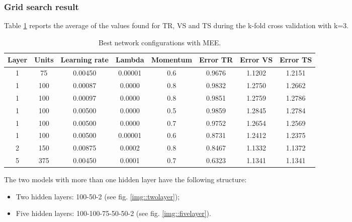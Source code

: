 \subsubsection{Grid search result}
Table \ref{tab:best_nets} reports the average of the values found for TR, VS and TS during the k-fold cross validation with k=3.   
\begin{center}
\small\addtolength{\tabcolsep}{-3pt}
\begin{table}[h!]
	\centering
	\begin{tabular}{|c|c|c|c|c|c|c|c|}
		\hline
		\textbf{Layer}& \textbf{Units}& \textbf{Learning rate} & \multicolumn{1}{l|}{\textbf{Lambda}} & \textbf{Momentum} & \textbf{Error TR}& \textbf{Error VS}& \textbf{Error TS}\\ \hline
			1 & 75 & 0.00450 & 0.00001 & 0.6  & 0.9676 & 1.1202 & 1.2151  \\
			1 & 100 & 0.00087 & 0.0000 & 0.8  & 0.9832 & 1.2750 &  1.2662\\
			1 & 100 & 0.00097 & 0.0000 & 0.8  & 0.9851 & 1.2759 &  1.2786\\
			1 & 100 & 0.00500 & 0.0000 & 0.5  & 0.9859 & 1.2845 & 1.2784 \\
			1 & 100 & 0.00500 & 0.0000 & 0.7  & 0.9752 & 1.2654 & 1.2569 \\
			1 & 100 & 0.00500 & 0.00001 & 0.6  & 0.8731& 1.2412 & 1.2375 \\
			2 & 150 & 0.00875 & 0.0002 & 0.8  & 0.8467 & 1.1332 &  1.1372 \\
			5 & 375 & 0.00450 & 0.0001 & 0.7  & 0.6323 & 1.1341 &  1.1341 \\
		  \hline
	\end{tabular}
		\caption{Best network configurations with MEE.}
		\label{tab:best_nets}
\end{table}
\end{center}
\newpage
The two models with more than one hidden layer have the following structure:
\begin{itemize}
	\item Two hidden layers: 100-50-2 (see fig. \ref{img::twolayer});
	\item Five hidden layers: 100-100-75-50-50-2 (see fig. \ref{img::fivelayer}).
\end{itemize}

